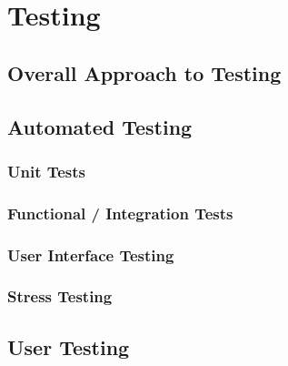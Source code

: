 \chapter{Testing}



\section{Overall Approach to Testing}


\section{Automated Testing}

\subsection{Unit Tests}

\subsection{Functional / Integration Tests}

\subsection{User Interface Testing}

\subsection{Stress Testing}


\section{User Testing}
